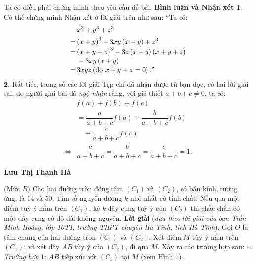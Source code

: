 \begin{multicols}{2}
	Ta có điều phải chứng minh theo yêu cầu đề bài.
	\vskip 0.05cm
	\textbf{\color{thachthuctoanhoc}Bình luận và Nhận xét}
	\vskip 0.05cm
	$\pmb{1.}$ Có thể chứng minh Nhận xét ở lời giải trên như sau:
	``Ta có:
	\begin{align*}
			&{x^3} + {y^3} + {z^3}\\
			= \,&{\left( {x + y} \right)^3} - 3xy\left( {x + y} \right) + {z^3}\\[-0.5ex]
			= \,&{\left( {x + y + z} \right)^3} - 3z\left( {x + y} \right)\left( {x + y + z} \right) \\[-0.5ex]
			&- 3xy\left( {x + y} \right)\\[-0.5ex]
			= \,&3xyz\left( {{\text{do }}x + y + z = 0} \right)."
	\end{align*}
	$\pmb{2.}$ Rất tiếc, trong số các lời giải Tạp chí đã nhận được từ bạn đọc, có hai lời giải sai, do người giải bài đã \textit{ngộ nhận} rằng, với giả thiết $a + b + c \ne 0$, ta có:
	\begin{align*}
		&f\left( a \right) + f\left( b \right) + f\left( c \right) \\[-0.5ex]
		&= \dfrac{a}{{a + b + c}}f\left( a \right) + \dfrac{b}{{a + b + c}}f\left( b \right) \\[-0.5ex]
		&\quad+ \dfrac{c}{{a + b + c}}f\left( c \right)\\[-0.5ex]
		\Leftrightarrow &\dfrac{a}{{a + b + c}} = \dfrac{b}{{a + b + c}} = \dfrac{c}{{a + b + c}} = 1.
	\end{align*}
	\begin{flushright}
		\textbf{\color{thachthuctoanhoc}Lưu Thị Thanh Hà}
	\end{flushright}
	{}
	(Mức $B$) Cho hai đường tròn đồng tâm $(C_1)$ và $(C_2)$, có bán kính, tương ứng, là $14$ và $50$. Tìm số nguyên dương $k$ nhỏ nhất có tính chất: Nếu qua một điểm tuỳ ý nằm trên $(C_1)$, kẻ $k$ dây cung tuỳ ý của $(C_2)$ thì chắc chắn có một dây cung có độ dài không nguyên. 
	\vskip 0.05cm
	\textbf{\color{thachthuctoanhoc}Lời giải} (\textit{dựa theo lời giải của bạn Trần Minh Hoàng, lớp 10T1, trường THPT chuyên Hà Tĩnh, tỉnh Hà Tĩnh})\textbf{\color{thachthuctoanhoc}.}
	\vskip 0.05cm
	Gọi $O$ là tâm chung của hai đường tròn $(C_1)$ và $(C_2)$.
	\vskip 0.05cm 
	Xét điểm $M$ tùy ý nằm trên  $(C_1)$; và xét dây $AB$ tùy ý của $(C_2)$, đi qua $M$. Xảy ra các trường hợp sau:
	\vskip 0.05cm
	$\diamond$ \textit{Trường hợp} $1$: $AB$ tiếp xúc với  $(C_1)$ tại $M$ (xem Hình $1$).
	\begin{figure}[H]

\end{figure}
\end{multicols}
